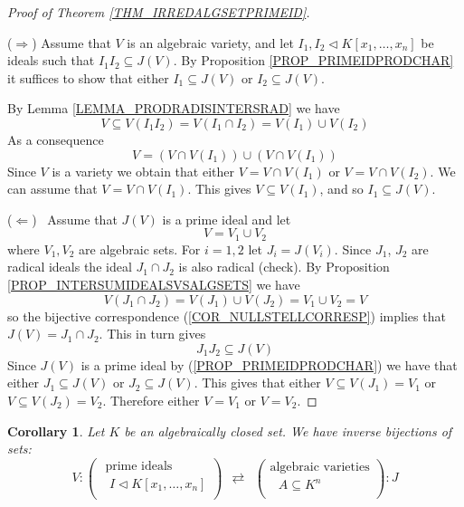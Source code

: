 \documentclass[12pt, letterpaper, oneside]{article}
\theoremstyle{plain}
\newtheorem{corollary}[theorem]{Corollary}
\theoremstyle{definition}
\newcommand{\vs}{\vskip 5mm}
\begin{document}
\begin{proof}[Proof of Theorem \ref{THM_IRREDALGSETPRIMEID}] \ 

($\Rightarrow$) Assume that $V$ is an algebraic variety, and let $I_{1}, I_{2}\lhd K[x_{1}, \dots, x_{n}]$ 
be ideals such that $I_{1}I_{2}\subseteq J(V)$. By  Proposition \ref{PROP_PRIMEIDPRODCHAR}
it suffices to show that either $I_{1}\subseteq J(V)$ or $I_{2}\subseteq J(V)$.

By Lemma \ref{LEMMA_PRODRADISINTERSRAD} we have 
$$V \subseteq V(I_{1}I_{2}) = V(I_{1}\cap I_{2}) = V(I_{1}) \cup V(I_{2})$$
As a consequence 
$$V=  (V\cap V(I_{1})) \cup  (V\cap V(I_{1}))$$
Since $V$ is a variety we obtain that  either $V= V\cap V(I_{1})$ or $V=V\cap V(I_{2})$. 
We can assume that $V = V\cap V(I_{1})$. This gives $V\subseteq V(I_{1})$, and so 
$I_{1} \subseteq J(V)$. 
 
 \vs

($\Leftarrow$) \ Assume that $J(V)$ is a prime ideal and let
$$V= V_{1}\cup V_{2}$$
where $V_{1}, V_{2}$ are algebraic sets. For $i=1, 2$ let $J_{i} = J(V_{i})$. 
Since $J_{1}$, $J_{2}$  are radical ideals the ideal $J_{1}\cap J_{2}$ is also radical (check).
By Proposition \ref{PROP_INTERSUMIDEALSVSALGSETS} we have 
$$V(J_{1}\cap J_{2}) = V(J_{1}) \cup V(J_{2}) = V_{1}\cup V_{2} = V$$
so the bijective correspondence (\ref{COR_NULLSTELLCORRESP})
implies that  $J(V) = J_{1} \cap J_{2}$.  This in turn gives 
$$J_{1}J_{2}\subseteq J(V)$$
Since  $J(V)$ is a prime ideal by (\ref{PROP_PRIMEIDPRODCHAR}) we have that either 
$J_{1}\subseteq J(V)$ or $J_{2}\subseteq J(V)$. This gives that either $V\subseteq V(J_{1}) = V_{1}$
or $V\subseteq V(J_{2}) = V_{2}$.  Therefore either $V= V_{1}$ or $V= V_{2}$. 


\end{proof}

\vs\vs

\begin{corollary}
Let $K$ be an algebraically closed set.
We have inverse bijections of sets: 
$$
V\colon
\begin{pmatrix}
\text{ prime ideals} \\[1mm]
\text{  $I\lhd  K[x_{1}, \dots, x_{n}]$} \\
\end{pmatrix}
\ \ \rightleftarrows \ \ 
\begin{pmatrix}
\text{algebraic varieties} \\[1mm]
\text{ $A\subseteq K^{n}$} \\
\end{pmatrix} \colon J
$$
\end{corollary}
\end{document}

